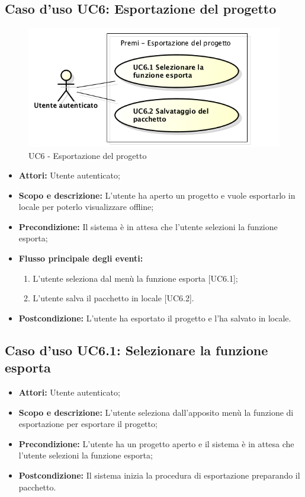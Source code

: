 \subsection{Caso d'uso UC6: Esportazione del progetto}
	\begin{figure}[h]
		\centering
		\includegraphics[scale=0.45] {img/UC6.png}
		\caption{UC6 - Esportazione del progetto}
	\end{figure}

	\begin{itemize}
		\item \textbf{Attori:} Utente autenticato;
		\item \textbf{Scopo e descrizione:} L'utente ha aperto un progetto e vuole esportarlo in locale per poterlo visualizzare offline;
		\item \textbf{Precondizione:} Il sistema è in attesa che l'utente selezioni la funzione esporta;
		\item \textbf{Flusso principale degli eventi:}
		\begin{enumerate}
			\item L'utente seleziona dal menù la funzione esporta [UC6.1];
			\item L'utente salva il pacchetto in locale [UC6.2].
		\end{enumerate}
		\item \textbf{Postcondizione:} L'utente ha esportato il progetto e l'ha salvato in locale.
	\end{itemize}


\subsection{Caso d'uso UC6.1: Selezionare la funzione esporta}
	\begin{itemize}
		\item \textbf{Attori:} Utente autenticato;
		\item \textbf{Scopo e descrizione:} L'utente seleziona dall'apposito menù la funzione di esportazione per esportare il progetto;
		\item \textbf{Precondizione:} L'utente ha un progetto aperto e il sistema è in attesa che l'utente selezioni la funzione esporta;
		\item \textbf{Postcondizione:} Il sistema inizia la procedura di esportazione preparando il pacchetto.
	\end{itemize}


